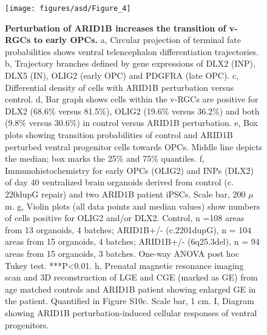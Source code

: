 \begin{figure}[b!]
    \centering
	\texttt{[image: figures/asd/Figure\_4]}
    \caption{\textbf{Perturbation of ARID1B increases the transition of v-RGCs to early OPCs.}
    a, Circular projection of terminal fate probabilities shows ventral telencephalon differentiation trajectories. b, Trajectory branches defined by gene expressions of DLX2 (INP), DLX5 (IN), OLIG2 (early OPC) and PDGFRA (late OPC). c, Differential density of cells with ARID1B perturbation versus control. d, Bar graph shows cells within the v-RGCs are positive for DLX2 (68.6\% versus 81.5\%), OLIG2 (19.6\% versus 36.2\%) and both (9.8\% versus 30.6\%) in control versus ARID1B perturbation. e, Box plots showing transition probabilities of control and ARID1B perturbed ventral progenitor cells towards OPCs. Middle line depicts the median; box marks the 25\% and 75\% quantiles. f, Immunohistochemistry for early OPCs (OLIG2) and INPs (DLX2) of day 40 ventralized brain organoids derived from control (c. 220dupG repair) and two ARID1B patient iPSCs. Scale bar, 200 $\mu$m. g, Violin plots (all data points and median values) show numbers of cells positive for OLIG2 and/or DLX2. Control, n =108 areas from 13 organoids, 4 batches; ARID1B+/- (c.2201dupG), n = 104 areas from 15 organoids, 4 batches; ARID1B+/- (6q25.3del), n = 94 areas from 15 organoids, 3 batches. One-way ANOVA post hoc Tukey test. ***P<0.01. h, Prenatal magnetic resonance imaging scan and 3D reconstruction of LGE and CGE (marked as GE) from age matched controls and ARID1B patient showing enlarged GE in the patient. Quantified in Figure S10c. Scale bar, 1 cm. I, Diagram showing ARID1B perturbation-induced cellular responses of ventral progenitors.}
    \label{fig:asd4}
\end{figure}

